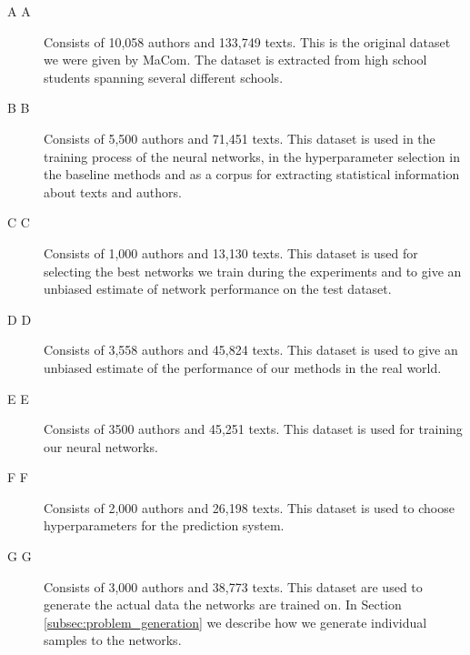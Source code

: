 \begin{description}

    \item[\glsdesc{A} \gls{A}]

        Consists of 10,058 authors and 133,749 texts. This is the original
        dataset we were given by MaCom. The dataset is extracted from high
        school students spanning several different schools.

    \item[\glsdesc{B} \gls{B}]

        Consists of 5,500 authors and 71,451 texts. This dataset is used in the
        training process of the neural networks, in the hyperparameter selection
        in the baseline methods and as a corpus for extracting statistical
        information about texts and authors.

    \item[\glsdesc{C} \gls{C}]

        Consists of 1,000 authors and 13,130 texts. This dataset is used for
        selecting the best networks we train during the experiments and to give
        an unbiased estimate of network performance on the test dataset.

    \item[\glsdesc{D} \gls{D}]

        Consists of 3,558 authors and 45,824 texts. This dataset is used to
        give an unbiased estimate of the performance of our methods in the real
        world.

    \item[\glsdesc{E} \gls{E}]

        Consists of 3500 authors and 45,251 texts. This dataset is used for
        training our neural networks.

    \item[\glsdesc{F} \gls{F}]

        Consists of 2,000 authors and 26,198 texts. This dataset is used to
        choose hyperparameters for the prediction system.

    \item[\glsdesc{G} \gls{G}]

        Consists of 3,000 authors and 38,773 texts. This dataset are used
        to generate the actual data the networks are trained on. In Section
        \ref{subsec:problem_generation} we describe how we generate individual
        samples to the networks.


\end{description}
